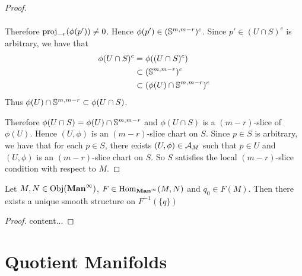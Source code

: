 \documentclass{book}
\begin{document}
\begin{proof}
\begin{itemize}
\begin{align*}
			\end{align*}
			Therefore $\prj_{-r}(\phi(p')) \neq 0$. Hence $\phi(p') \in (\S^{m, m-r})^c$. Since $p' \in (U \cap S)^c$ is arbitrary, we have that 
			\begin{align*}
				\phi(U \cap S)^c
				& = \phi((U \cap S)^c) \\
				& \subset (\S^{m, m-r})^c \\
				& \subset (\phi(U) \cap \S^{m, m-r})^c
			\end{align*}
			Thus $\phi(U) \cap \S^{m, m-r} \subset \phi(U \cap S)$. 
		\end{itemize}
		Therefore $\phi(U \cap S) = \phi(U) \cap \S^{m, m-r}$ and $\phi(U \cap S)$ is a $(m-r)$-slice of $\phi(U)$. Hence $(U, \phi)$ is an $(m-r)$-slice chart on $S$. Since $p \in S$ is arbitrary, we have that for each $p \in S$, there exists $(U, \phi) \in \MA_M$ such that $p \in U$ and $(U, \phi)$ is an $(m-r)$-slice chart on $S$. So $S$ satisfies the local $(m-r)$-slice condition with respect to $M$.  
	\end{proof}
	
	\begin{ex}
		 Let $M, N \in \Obj(\Maninf)$, $F \in \Hom_{\Maninf}(M,N)$ and $q_0 \in F(M)$. Then there exists a unique smooth structure on $F^{-1}(\{q\})$ 
	\end{ex}

	\begin{proof}
		content...
	\end{proof}
	
	
	\begin{ex}
		
	\end{ex}
	
	
	
	
	
	
	






	
	
	
	
	
	
	
	
	
	
	
	
	
	
	
	
	
	
	
	
	
	\newpage
	\section{Quotient Manifolds}
	
\end{document}

